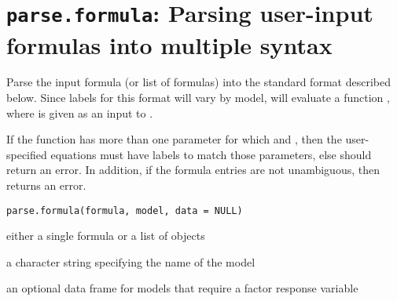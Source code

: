  \section{{\tt parse.formula}: Parsing user-input formulas into multiple syntax}\label{ss:parse.formula}
\begin{Description}\relax
Parse the input formula (or list of formulas) into the 
standard format described below.  Since labels for this format will vary 
by model,  will evaluate a function ,
where  is given as an input to .

If the  function has more than one parameter for
which  and , then the
user-specified equations must have labels to match those parameters,
else  should return an error. In addition, if the
formula entries are not unambiguous, then  returns an error.
\end{Description}
\begin{Usage}
\begin{verbatim}
parse.formula(formula, model, data = NULL)
\end{verbatim}
\end{Usage}
\begin{Arguments}
\begin{ldescription}
\item[\code{formula}] either a single formula or a list of  objects
\item[\code{model}] a character string specifying the name of the model
\item[\code{data}] an optional data frame for models that require a factor response variable
\end{ldescription}
\end{Arguments}

